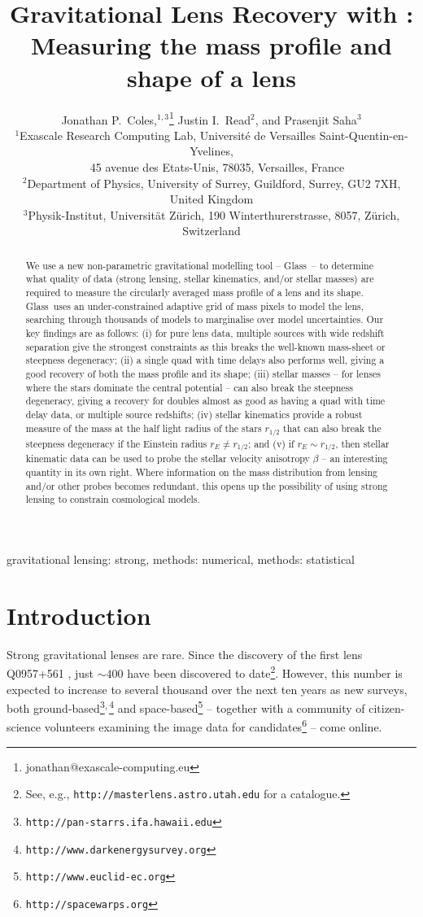\documentclass[galley,usenatbib]{mn2e}
\title[Lens Recovery with \Glass]{Gravitational Lens Recovery with \Glass: Measuring the mass profile and shape of a lens}
\author[J.~P.~Coles~et~al.]{%
Jonathan P.~Coles,$^{1,3}$\thanks{jonathan@exascale-computing.eu}%
\newauthor%
Justin I.~Read$^2$,%
\newauthor%
and Prasenjit Saha$^3$%
%
\\
$^1$Exascale Research Computing Lab, Universit\'e de Versailles Saint-Quentin-en-Yvelines,\\$\quad$45 avenue des Etats-Unis, 78035, Versailles, France\\
$^2$Department of Physics, University of Surrey, Guildford, Surrey, GU2 7XH, United Kingdom \\
$^3$Physik-Institut, Universit\"at Z\"urich, 190 Winterthurerstrasse, 8057, Z\"urich, Switzerland
}
\newcommand{\Glass}{{\sc Glass}}
\newcommand{\url}[1]{\tt #1}
\begin{document}
\maketitle

\begin{abstract}
We use a new non-parametric gravitational modelling tool -- \Glass\ -- to
determine what quality of data (strong lensing, stellar kinematics, and/or
stellar masses) are required to measure the circularly averaged mass profile of
a lens and its shape. \Glass\ uses an under-constrained adaptive grid of mass
pixels to model the lens, searching through thousands of models to marginalise
over model uncertainties. Our key findings are as follows: (i) for pure lens
data, multiple sources with wide redshift separation give the strongest
constraints as this breaks the well-known mass-sheet or steepness degeneracy;
(ii) a single quad with time delays also performs well, giving a good recovery
of both the mass profile and its shape; (iii) stellar masses -- for lenses
where the stars dominate the central potential -- can also break the steepness
degeneracy, giving a recovery for doubles almost as good as having a quad with time delay data, or
multiple source redshifts; (iv) stellar kinematics provide a robust measure of
the mass at the half light radius of the stars $r_{1/2}$ that can also break
the steepness degeneracy if the Einstein radius $r_E \neq r_{1/2}$; and (v)
if $r_E \sim r_{1/2}$, then stellar kinematic data can be used to probe the
stellar velocity anisotropy $\beta$ -- an interesting quantity in its own
right. Where information on the mass distribution from lensing and/or other
probes becomes redundant, this opens up the possibility of using strong lensing
to constrain cosmological models. 
\end{abstract}

\begin{keywords}
gravitational lensing: strong, methods: numerical, methods: statistical
\end{keywords}

\section{Introduction}\label{sec:intro}

Strong gravitational lenses are rare. Since the discovery of the first lens
Q0957+561 \citep{1979Natur.279..381W}, just $\sim400$ have been discovered to
date\footnote{See, e.g., {\url{http://masterlens.astro.utah.edu}} for a
catalogue.}.  However, this number is expected to increase to several thousand
over the next ten years as new surveys, both
ground-based\footnote{\url{http://pan-starrs.ifa.hawaii.edu}}$^{\rm,}$\footnote{\url{http://www.darkenergysurvey.org}}
and space-based\footnote{\url{http://www.euclid-ec.org}} -- together with a
community of citizen-science volunteers examining the image data for
candidates\footnote{\url{http://spacewarps.org}} -- come online. 
\end{document}
